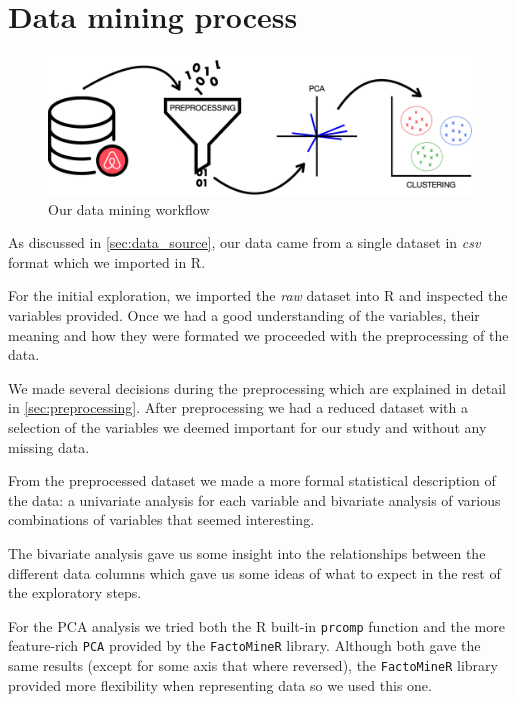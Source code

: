 

\section{Data mining process}%
\label{sec:data_mining_process}

\begin{figure}[H]
    \centering
    \includegraphics[width=0.6\linewidth]{images/workflow.pdf}
    \caption{Our data mining workflow}%
    \label{fig:airbnblistingsPlot.PNG}
\end{figure}

As discussed in \cref{sec:data_source}, our data came from a single dataset
in \emph{csv} format which we imported in R.

For the initial exploration, we imported the \emph{raw} dataset into R and
inspected the variables provided. Once we had a good understanding of the
variables, their meaning and how they were formated we proceeded with the
preprocessing of the data.

We made several decisions during the preprocessing which are explained in detail
in \cref{sec:preprocessing}. After preprocessing we had a reduced dataset with
a selection of the variables we deemed important for our study and without
any missing data.

From the preprocessed dataset we made a more formal statistical description of
the data: a univariate analysis for each variable and bivariate analysis of
various combinations of variables that seemed interesting.


The bivariate analysis gave us some insight into the relationships between the
different data columns which gave us some ideas of what to expect in the rest of
the exploratory steps.

For the PCA analysis we tried both the R built-in \texttt{prcomp} function and
the more feature-rich \texttt{PCA} provided by the \texttt{FactoMineR} library.
Although both gave the same results (except for some axis that where reversed),
the \texttt{FactoMineR} library provided more flexibility when representing data
so we used this one.

